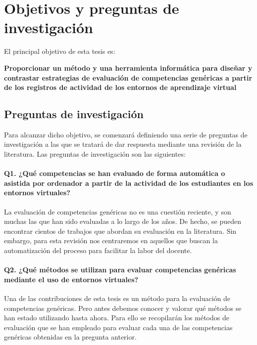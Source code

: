 
\section{Objetivos y preguntas de investigación}
\label{sec:objetivos}

El principal objetivo de esta tesis es:


\bigskip
\textbf{Proporcionar un método y una herramienta informática para diseñar y contrastar estrategias de evaluación de competencias genéricas a partir de los registros de actividad de los entornos de aprendizaje virtual}
\bigskip

\subsection{Preguntas de investigación}

Para alcanzar dicho objetivo, se comenzará definiendo una serie de preguntas de investigación a las que se tratará de dar respuesta mediante una revisión de la literatura. Las preguntas de investigación son las siguientes:

\paragraph*{Q1. ¿Qué competencias se han evaluado de forma automática o asistida por ordenador a partir de la actividad de los estudiantes en los entornos virtuales?}

La evaluación de competencias genéricas no es una cuestión reciente, y son muchas las que han sido evaluadas a lo largo de los años. De hecho, se pueden encontrar cientos de trabajos que abordan su evaluación en la literatura. Sin embargo, para esta revisión nos centraremos en aquellos que buscan la automatización del proceso para facilitar la labor del docente.

\paragraph*{Q2. ¿Qué métodos se utilizan para evaluar competencias genéricas mediante el uso de entornos virtuales?}

Una de las contribuciones de esta tesis es un método para la evaluación de competencias genéricas. Pero antes debemos conocer y valorar qué métodos se han estado utilizando hasta ahora. Para ello se recopilarán los métodos de evaluación que se han empleado para evaluar cada una de las competencias genéricas obtenidas en la pregunta anterior.

